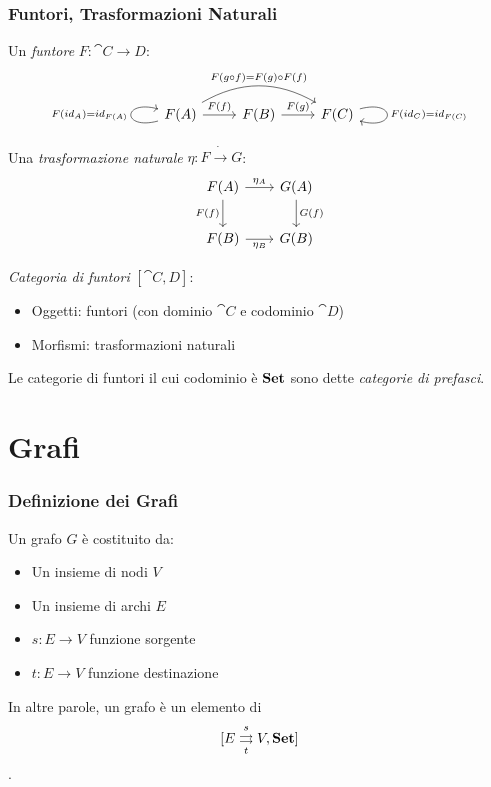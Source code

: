\documentclass[8pt]{beamer}
\begin{document}
\begin{frame}[fragile]\frametitle{Funtori, Trasformazioni Naturali}
	Un \emph{funtore} $F: \cat{C \to D}$:
        \[\begin{tikzcd} F(A) \arrow[loop left, "{F(id_A) = id_{F(A)}}"] \arrow[r, "F(f)"] 
        \arrow[rr, bend left=30, "{F(g \circ f) = F(g) \circ F(f)}"] & F(B) \arrow[r, "F(g)"] & F(C) 
        \arrow[loop right, "{F(id_C) = id_{F(C)}}"] \end{tikzcd}\]

        Una \emph{trasformazione naturale} $\eta:F \dot\to G$: %
    \[
        \begin{tikzcd}[row sep = 20, column sep = 20]
            F(A) \arrow[d, "F(f)" swap] \arrow[r, "{\eta_A}"] & G(A) \arrow[d, "G(f)"] \\
            F(B) \arrow[r, "{\eta_B}"swap] & G(B)
        \end{tikzcd}
    \]

    \emph{Categoria di funtori} $[\cat{C, D}]$:
    \begin{itemize}
	    \item Oggetti: funtori (con dominio $\cat C$ e codominio $\cat D$)
	    \item Morfismi: trasformazioni naturali
	\end{itemize}
        \smallskip

    Le categorie di funtori il cui codominio è $\mathbf{Set}$ sono dette \emph{categorie di prefasci}.
\end{frame}

\section{Grafi}

\begin{frame}[fragile]\frametitle{Definizione dei Grafi}

	Un grafo $G$ è costituito da:
	\begin{itemize}
		\item Un insieme di nodi $V$
		\item Un insieme di archi $E$
		\item $s: E \to V$ funzione sorgente
		\item $t: E \to V$ funzione destinazione
	\end{itemize}
	In altre parole, un grafo è un elemento di $$[E \mathrel{\mathop{\rightrightarrows}^{s}_{t}} V , \mathbf{Set}]$$.
\end{frame}
\end{document}
